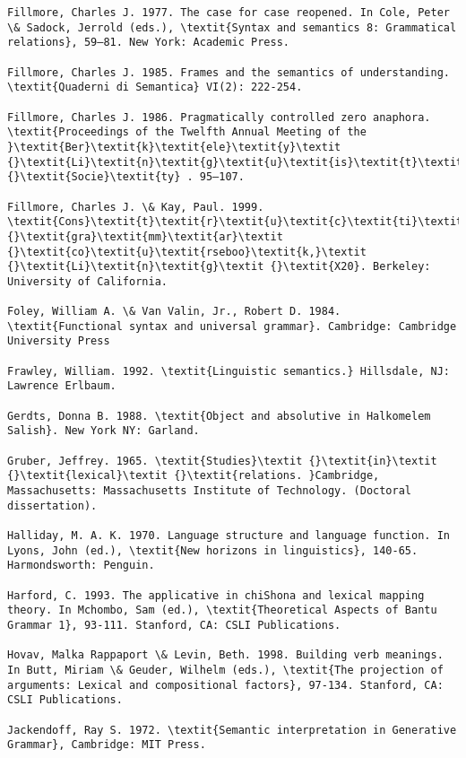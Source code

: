 \documentclass[output=paper]{langsci/langscibook}
\begin{document}
\begin{verbatim}
Fillmore, Charles J. 1977. The case for case reopened. In Cole, Peter \& Sadock, Jerrold (eds.), \textit{Syntax and semantics 8: Grammatical relations}, 59–81. New York: Academic Press.

Fillmore, Charles J. 1985. Frames and the semantics of understanding. \textit{Quaderni di Semantica} VI(2): 222-254.

Fillmore, Charles J. 1986. Pragmatically controlled zero anaphora. \textit{Proceedings of the Twelfth Annual Meeting of the }\textit{Ber}\textit{k}\textit{ele}\textit{y}\textit {}\textit{Li}\textit{n}\textit{g}\textit{u}\textit{is}\textit{t}\textit{ics}\textit {}\textit{Socie}\textit{ty} . 95–107.

Fillmore, Charles J. \& Kay, Paul. 1999. \textit{Cons}\textit{t}\textit{r}\textit{u}\textit{c}\textit{ti}\textit{o}\textit{n}\textit {}\textit{gra}\textit{mm}\textit{ar}\textit {}\textit{co}\textit{u}\textit{rseboo}\textit{k,}\textit {}\textit{Li}\textit{n}\textit{g}\textit {}\textit{X20}. Berkeley: University of California.

Foley, William A. \& Van Valin, Jr., Robert D. 1984. \textit{Functional syntax and universal grammar}. Cambridge: Cambridge University Press

Frawley, William. 1992. \textit{Linguistic semantics.} Hillsdale, NJ: Lawrence Erlbaum.

Gerdts, Donna B. 1988. \textit{Object and absolutive in Halkomelem Salish}. New York NY: Garland.

Gruber, Jeffrey. 1965. \textit{Studies}\textit {}\textit{in}\textit {}\textit{lexical}\textit {}\textit{relations. }Cambridge, Massachusetts: Massachusetts Institute of Technology. (Doctoral dissertation).

Halliday, M. A. K. 1970. Language structure and language function. In Lyons, John (ed.), \textit{New horizons in linguistics}, 140-65. Harmondsworth: Penguin.

Harford, C. 1993. The applicative in chiShona and lexical mapping theory. In Mchombo, Sam (ed.), \textit{Theoretical Aspects of Bantu Grammar 1}, 93-111. Stanford, CA: CSLI Publications.

Hovav, Malka Rappaport \& Levin, Beth. 1998. Building verb meanings. In Butt, Miriam \& Geuder, Wilhelm (eds.), \textit{The projection of arguments: Lexical and compositional factors}, 97-134. Stanford, CA: CSLI Publications.

Jackendoff, Ray S. 1972. \textit{Semantic interpretation in Generative Grammar}, Cambridge: MIT Press.


\end{verbatim}
\end{document}
